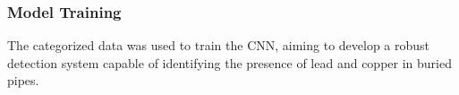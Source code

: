 \subsubsection{Model Training}
The categorized data was used to train the CNN, aiming to develop a robust detection system capable of identifying the presence of lead and copper in buried pipes.

 

% 				
% 



